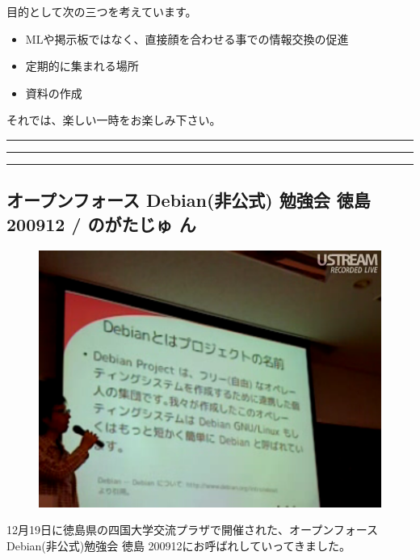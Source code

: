 \documentclass[mingoth,a4paper]{jsarticle}
\begin{document}
 目的として次の三つを考えています。
 \begin{itemize}
  \item MLや掲示板ではなく、直接顔を合わせる事での情報交換の促進
  \item 定期的に集まれる場所
  \item 資料の作成
 \end{itemize}

 それでは、楽しい一時をお楽しみ下さい。

\newpage

\begin{minipage}[b]{0.2\hsize}
 {}
\end{minipage}
\begin{minipage}[b]{0.8\hsize}
\hrule
\vspace{2mm}
\hrule
\setcounter{tocdepth}{1}
\tableofcontents
\vspace{2mm}
\hrule
\end{minipage}


\subsection{オープンフォース Debian(非公式) 勉強会 徳島 200912 / のがたじゅ
ん}

\begin{figure}
 \includegraphics[width=16zw]{image200912/tokushima1.png}
\end{figure}

12月19日に徳島県の四国大学交流プラザで開催された、オープンフォース
Debian(非公式)勉強会 徳島 200912にお呼ばれしていってきました。
\end{document}
